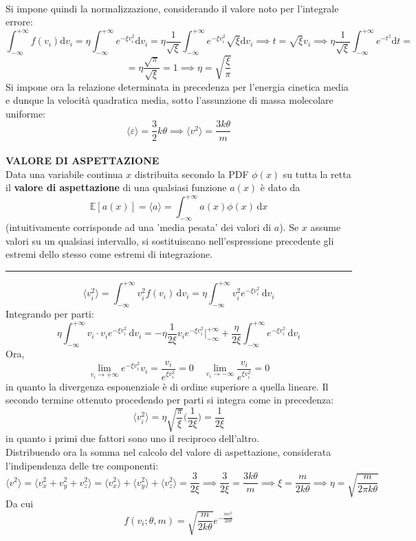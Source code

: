 \documentclass[10pt, oneside]{book}
\newcommand{\limit}[2]{\lim\limits_{#1 \rightarrow #2}}
\newcommand{\mean}[1]{\langle #1 \rangle}
\newcommand{\infobox}[2]{\vspace{0.5cm}~\\ \textbf{#1} \hrulefill \vspace{0.2cm}\\#2 {}\,\\\hrule \vspace{0.5cm}}
\begin{document}
\\Si impone quindi la normalizzazione, considerando il valore noto per l'integrale errore:
\[\int_{-\infty}^{+\infty}f(v_i)\mathrm{d}v_i = \eta \int_{-\infty}^{+\infty}e^{-\xi v_i^2}\mathrm{d}v_i = \eta \frac{1}{\sqrt{\xi}} \int_{-\infty}^{+\infty} e^{-\xi v_i^2}\sqrt{\xi}\mathrm{d}v_i \implies
t = \sqrt{\xi}v_i \implies \eta \frac{1}{\sqrt{\xi}} \int_{-\infty}^{+\infty}e^{-t^2}\mathrm{d}t =\]
\[= \eta \frac{\sqrt{\pi}}{\sqrt{\xi}} = 1 \implies \eta = \sqrt{\frac{\xi}{\pi}}\]
Si impone ora la relazione determinata in precedenza per l'energia cinetica media e dunque la velocità quadratica media, sotto l'assunzione di massa molecolare uniforme:
\[\langle \varepsilon \rangle = \frac{3}{2} k \theta \implies \langle v^2 \rangle = \frac{3 k \theta}{m}\]
\infobox{VALORE DI ASPETTAZIONE}{Data una variabile continua $x$ distribuita secondo la PDF $\phi(x)$ su tutta la retta il \textbf{valore di aspettazione} di una qualsiasi funzione $a(x)$ è dato da
\[\mathbb{E}[a(x)] = \langle a \rangle = \int_{-\infty}^{+\infty} a(x) \phi(x) \, \mathrm{d}x\]
(intuitivamente corrisponde ad una 'media pesata' dei valori di $a$). Se $x$ assume valori su un qualsiasi intervallo, si sostituiscano nell'espressione precedente gli estremi dello stesso come estremi di integrazione.}
\[\langle v_i^2 \rangle = \int_{-\infty}^{+\infty} v_i^2 f(v_i)\, \mathrm{d}v_i = \eta \int_{-\infty}^{+\infty} v_i^2 e^{-\xi v_i^2}\, \mathrm{d}v_i\]
Integrando per parti:
\[\eta \int_{-\infty}^{+\infty} v_i \cdot v_i e^{- \xi v_i^2}\, \mathrm{d}v_i = - \eta \frac{1}{2 \xi} v_i e^{- \xi v_i^2}\bigg|_{-\infty}^{+\infty} + \frac{\eta}{2\xi} \int_{-\infty}^{+\infty} e^{-\xi v_i^2}\, \mathrm{d}v_i\]
Ora,
\[\limit{v_i}{+\infty} e^{- \xi v_i^2} v_i = \frac{v_i}{e^{\xi v_i^2}} = 0 \quad \limit{v_i}{-\infty} \frac{v_i}{e^{\xi v_i^2}} = 0\]
in quanto la divergenza esponenziale è di ordine superiore a quella lineare. Il secondo termine ottenuto procedendo per parti si integra come in precedenza:
\[\mean{v_i^2} = \eta \sqrt{\frac{\pi}{\xi}} \big(\frac{1}{2 \xi}\big) = \frac{1}{2 \xi}\]
in quanto i primi due fattori sono uno il reciproco dell'altro.
\\Distribuendo ora la somma nel calcolo del valore di aspettazione, considerata l'indipendenza delle tre componenti:
\[\mean{v^2} = \mean{v_x^2 + v_y^2 + v_z^2} = \mean{v_x^2} + \mean{v_y^2} + \mean{v_z^2} = \frac{3}{2 \xi} \implies \frac{3}{2 \xi} = \frac{3k \theta}{m} \implies \xi = \frac{m}{2 k \theta} 	\implies \eta = \sqrt{\frac{m}{2 \pi k \theta}}\]
Da cui
\[f(v_i; \theta, m) = \sqrt{\frac{m}{2 k \theta}} e^{\displaystyle - \frac{m v_i^2}{2 k \theta}}\]
\end{document}
